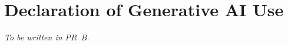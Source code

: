 \section{Declaration of Generative AI Use}
\label{sec:ai_declaration}
\emph{To be written in PR~B.}
